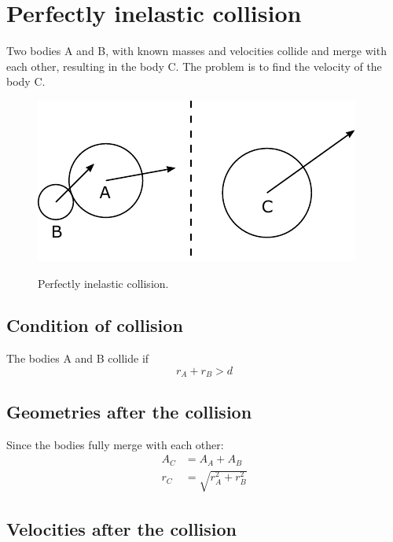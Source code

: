 \documentclass{article}
\begin{document}
\section{Perfectly inelastic collision}
\label{sec:prefectly_inelastic_collision}
Two bodies A and B, with known masses and velocities collide and merge with each other, resulting in the body C. The problem is to find the velocity of the body C.

\begin{figure}[h]
	\centering
	{\includegraphics{figures/perfectly_inelastic_collision.pdf}}
	\caption{Perfectly inelastic collision.}\label{fig:perfectly_inelastic_collision}
\end{figure}

\subsection{Condition of collision}
The bodies A and B collide if
\begin{equation}
r_A + r_B > d
\end{equation}

\subsection{Geometries after the collision}
Since the bodies fully merge with each other:
\begin{equation}
\begin{split}
A_C &= A_A + A_B\\
r_C &= \sqrt{r_A^2 + r_B^2}
\end{split}
\end{equation}


\subsection{Velocities after the collision}
\end{document}
